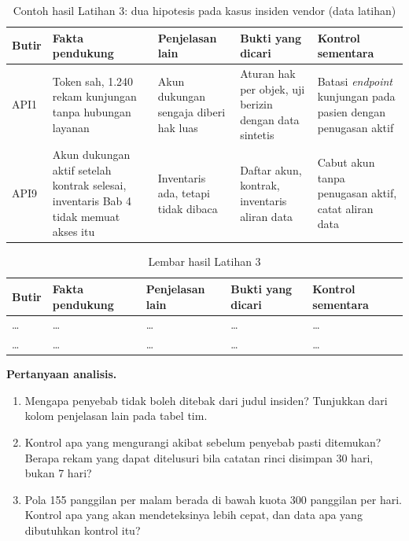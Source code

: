 \begin{table}[!htb]
  \centering
  \caption{Contoh hasil Latihan 3: dua hipotesis pada kasus insiden vendor (data latihan)}
  \label{tab:ch06-lat3-contoh}
  \footnotesize
  \begin{tabularx}{\textwidth}{T{1.0cm}QQQQ}
    \hline
    \textbf{Butir} & \textbf{Fakta pendukung} & \textbf{Penjelasan lain} & \textbf{Bukti yang dicari} & \textbf{Kontrol sementara} \\ \hline
    API1 & Token sah, 1.240 rekam kunjungan tanpa hubungan layanan & Akun dukungan sengaja diberi hak luas & Aturan hak per objek, uji berizin dengan data sintetis & Batasi \textit{endpoint} kunjungan pada pasien dengan penugasan aktif \\ \hline
    API9 & Akun dukungan aktif setelah kontrak selesai, inventaris Bab 4 tidak memuat akses itu & Inventaris ada, tetapi tidak dibaca & Daftar akun, kontrak, inventaris aliran data & Cabut akun tanpa penugasan aktif, catat aliran data \\ \hline
  \end{tabularx}
\end{table}

\begin{table}[!htb]
  \centering
  \caption{Lembar hasil Latihan 3}
  \label{tab:ch06-lat3-hasil}
  \footnotesize
  \begin{tabularx}{\textwidth}{T{1.0cm}QQQQ}
    \hline
    \textbf{Butir} & \textbf{Fakta pendukung} & \textbf{Penjelasan lain} & \textbf{Bukti yang dicari} & \textbf{Kontrol sementara} \\ \hline
    \dots & \dots & \dots & \dots & \dots \\ \hline
    \dots & \dots & \dots & \dots & \dots \\ \hline
  \end{tabularx}
\end{table}

\textbf{Pertanyaan analisis.}
\begin{enumerate}
  \item Mengapa penyebab tidak boleh ditebak dari judul insiden? Tunjukkan dari kolom penjelasan lain pada tabel tim.
  \item Kontrol apa yang mengurangi akibat sebelum penyebab pasti ditemukan? Berapa rekam yang dapat ditelusuri bila catatan rinci disimpan 30 hari, bukan 7 hari?
  \item Pola 155 panggilan per malam berada di bawah kuota 300 panggilan per hari. Kontrol apa yang akan mendeteksinya lebih cepat, dan data apa yang dibutuhkan kontrol itu?
\end{enumerate}
